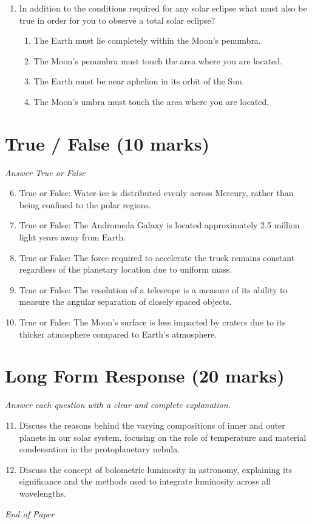 \documentclass[12pt]{article}
\begin{document}
\begin{enumerate}[label=\arabic*.]
\begin{enumerate}[label=(\alph*)]
    \item Perseus
    \item Cygnus
    \item Scorpius
    \item Leo
\end{enumerate}
\item In addition to the conditions required for any solar eclipse what must also be true in order for you to observe a total solar eclipse?
\begin{enumerate}[label=(\alph*)]
    \item The Earth must lie completely within the Moon's penumbra.
    \item The Moon's penumbra must touch the area where you are located.
    \item The Earth must be near aphelion in its orbit of the Sun.
    \item The Moon's umbra must touch the area where you are located.
\end{enumerate}
\end{enumerate}

\section*{True / False (10 marks)}
\textit{Answer True or False}
\begin{enumerate}[label=\arabic*.]
\setcounter{enumi}{5}
\item True or False: Water-ice is distributed evenly across Mercury, rather than being confined to the polar regions.
\item True or False: The Andromeda Galaxy is located approximately 2.5 million light years away from Earth.
\item True or False: The force required to accelerate the truck remains constant regardless of the planetary location due to uniform mass.
\item True or False: The resolution of a telescope is a measure of its ability to measure the angular separation of closely spaced objects.
\item True or False: The Moon's surface is less impacted by craters due to its thicker atmosphere compared to Earth's atmosphere.
\end{enumerate}

\section*{Long Form Response (20 marks)}
\textit{Answer each question with a clear and complete explanation.}
\begin{enumerate}[label=\arabic*.]
\setcounter{enumi}{10}
\item Discuss the reasons behind the varying compositions of inner and outer planets in our solar system, focusing on the role of temperature and material condensation in the protoplanetary nebula.
\item Discuss the concept of bolometric luminosity in astronomy, explaining its significance and the methods used to integrate luminosity across all wavelengths.
\end{enumerate}

\vfill
\noindent\textit{End of Paper}
\end{document}
